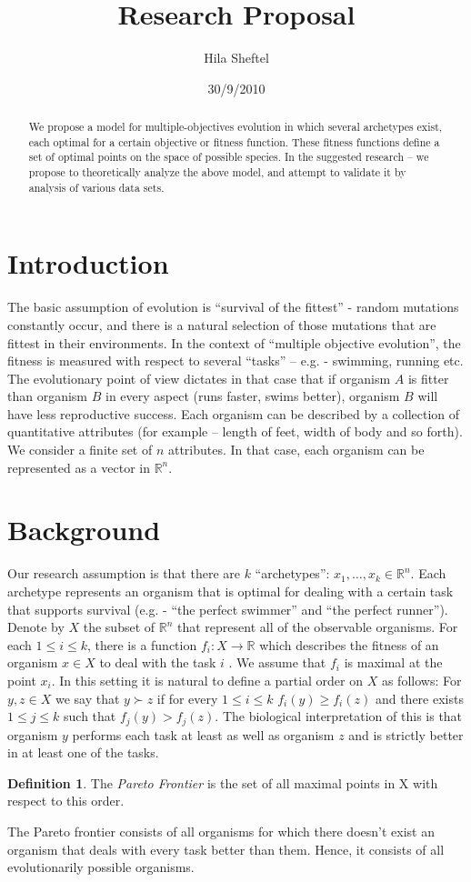 \documentclass{article}
\title{Research Proposal}
\author{Hila Sheftel}
\date{30/9/2010}
\theoremstyle{definition}
\newtheorem*{define}{Definition}
\theoremstyle{remark}
\begin{document}
\begin{abstract}
We propose a model for multiple-objectives evolution in which several archetypes exist, 
each optimal for a certain objective or fitness function. 
These fitness functions define a set of optimal points on the space of possible species. In the suggested research – we propose to theoretically analyze the above model, and attempt to validate it by analysis of various data sets.
\end{abstract}
\section{Introduction}
The basic assumption of evolution is “survival of the fittest” - 
random mutations constantly occur, and there is a natural selection of those  mutations that are fittest in their environments. 
In the context of “multiple objective evolution”, 
the fitness is measured with respect to several “tasks” – e.g. - swimming, running etc. 
The evolutionary point of view dictates in that case that if organism $A$ is fitter than organism $B$ in every aspect 
(runs faster, swims better), organism $B$ will have less reproductive success. 
Each organism can be described by a collection of quantitative attributes 
(for example – length of feet, width of body and so forth). 
We consider a finite set of $n$ attributes. In that case, each organism can be represented as a vector in $\mathbb{R}^n$.
\section{Background}
Our research assumption is that there are $k$ “archetypes”: $x_1,\ldots,x_k \in \mathbb{R}^n$. 
Each archetype represents an organism that is optimal for dealing with a certain task that supports survival 
(e.g. - “the perfect swimmer” and “the perfect runner”). 
Denote by $X$ the subset of $\mathbb{R}^n$ that represent all of the observable organisms. 
For each $1\leq i \leq k$, there is a function $f_i: X \rightarrow \mathbb{R}$ 
which describes the fitness of an organism $x \in X$ to deal with the task $i$ . 
We assume that $f_i$ is maximal at the point $x_i$.
In this setting it is natural to define a partial order on $X$ as follows: 
For $y,z \in X$ we say that $y \succ z$ if for every $1\leq i \leq k$ $f_i(y)\geq f_i(z)$ 
and there exists $1\leq j \leq k$ such that $f_j(y) > f_j(z)$. 
The biological interpretation of this is that organism $y$ performs each task at least as well as organism $z$ 
and is strictly better in at least one of the tasks. 
\begin{define}
The \textit{Pareto Frontier} is the set of all maximal points in X with respect to this order.
\end{define}
The Pareto frontier consists of all organisms for which there doesn’t exist an organism that deals with every task better than them. 
Hence, it consists of all evolutionarily possible organisms. 
\end{document}
